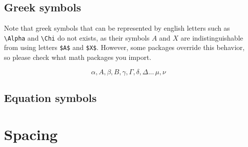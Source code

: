 \documentclass[12pt]{article}
\begin{document}
\subsection*{Greek symbols}
Note that greek symbols that can be represented by english letters such as \verb!\Alpha! and \verb!\Chi! do not exists, as their symbols $A$ and $X$ are indistinguishable from using letters \verb!$A$! and \verb!$X$!. However, some packages override this behavior, so please check what math packages you import.

$$\alpha, A, \beta, B, \gamma, \Gamma, \delta, \Delta ...\, \mu, \nu $$

\subsection*{Equation symbols}

\section{Spacing}
\end{document}

